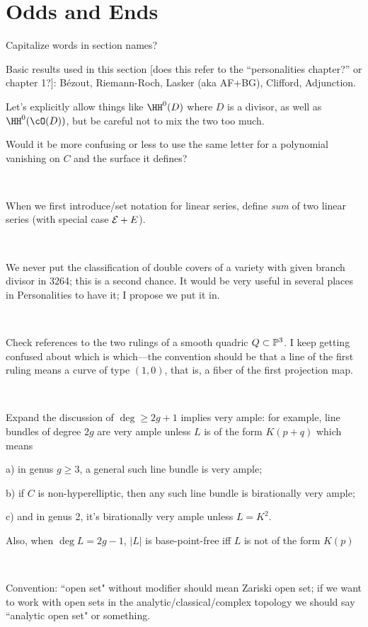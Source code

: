 \documentclass[12pt, leqno]{book}
\begin{document}
\section{Odds and Ends}

Capitalize words in section names?

Basic results used in this section [does this refer to the ``personalities chapter?'' or chapter 1?]: B\'ezout, Riemann-Roch, Lasker (aka AF+BG), Clifford, Adjunction.

Let's explicitly allow things like $\HH^0(D)$ where $D$ is a divisor, as well as $\HH^0(\cO(D))$, but be careful not to mix the two too much.

Would it be more confusing or less to use the same letter for a polynomial vanishing on $C$ and the surface it defines?

\

When we first introduce/set notation for linear series, define \emph{sum} of two linear series 
(with special case $\cE + E$).

\

We never put the classification of double covers of a variety with given branch divisor in 3264; this is a second chance. It would be very useful in several places in Personalities to have it; I propose we put it in.

\

Check references to the two rulings of a smooth quadric $Q \subset \PP^3$. I keep getting confused about which is which---the convention should be that a line of the first ruling means a curve of type $(1,0)$, that is, a fiber of the first projection map.

\

Expand the discussion of $\deg \geq 2g+1$ implies very ample: for example, line bundles of degree $2g$ are very ample unless $L$ is of the form $K(p+q)$ which means 

a) in genus $g \geq 3$, a general such line bundle is very ample; 

b) if $C$ is non-hyperelliptic, then any such line bundle is birationally very ample;

c) and in genus 2, it's birationally very ample unless $L = K^2$.

Also, when $\deg L = 2g-1$, $|L|$ is base-point-free iff $L$ is not of the form $K(p)$

\

Convention: ``open set" without modifier should mean Zariski open set; if we want to work with open sets in the analytic/classical/complex topology we should say ``analytic open set" or something.
\end{document}
